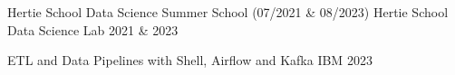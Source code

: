 

\begin{cvhonors}
  \cvhonor
    {Hertie School Data Science Summer School (07/2021 \& 08/2023)} %
    {Hertie School Data Science Lab} %
    {} %
    {2021 \& 2023} %

  \cvhonor
    {ETL and Data Pipelines with Shell, Airflow and Kafka} %
    {IBM} %
    {} %
    {2023} %

\end{cvhonors}

